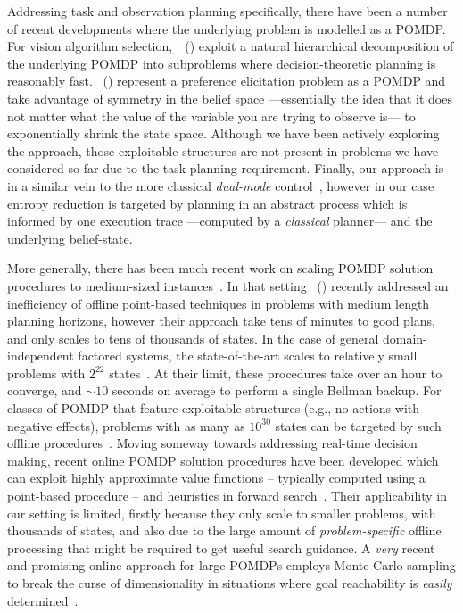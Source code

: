 






Addressing task and observation planning specifically, there have been
a number of recent developments where the underlying problem is
modelled as a POMDP.
For vision algorithm
selection,~\citeauthor{hippo-jnl}~(\citeyear{hippo-jnl}) exploit a
natural hierarchical decomposition of the underlying POMDP into
subproblems where decision-theoretic planning is reasonably
fast. \citeauthor{doshi08:pref_elic}~(\citeyear{doshi08:pref_elic})
represent a preference elicitation problem as a POMDP and take
advantage of symmetry in the belief space ---essentially the idea that
it does not matter what the value of the variable you are trying to
observe is--- to exponentially shrink the state space. Although we
have been actively exploring the \citeauthor{doshi08:pref_elic}
approach, those exploitable structures are not present in problems we
have considered so far due to the task planning requirement. 
Finally,
our approach is in a similar vein to the more classical {\em
dual-mode} control~\cite{cassandra96actingunder}, however in our case
entropy reduction is targeted by planning in an abstract process which
is informed by one execution trace ---computed by a {\em classical}
planner--- and the underlying belief-state.


More generally, there has been much recent work on scaling POMDP
solution procedures to medium-sized
instances~\cite{shani:etal:08,KurHsu08}. In that
setting \citeauthor{kurniawati:etal:2010}~(\citeyear{kurniawati:etal:2010})
recently addressed an inefficiency of offline point-based techniques
in problems with medium length planning horizons, however their
approach take tens of minutes to good plans, and only scales to tens
of thousands of states. In the case of general domain-independent
factored systems, the state-of-the-art scales to relatively small
problems with $2^{22}$ states~\cite{shani:etal:2008}. At their limit,
these procedures take over an hour to converge, and $\sim10$ seconds
on average to perform a single Bellman backup.  For classes of POMDP
that feature exploitable structures (e.g., no actions with negative
effects), problems with as many as $10^{30}$ states can be targeted by
such offline procedures~\cite{brunskill:russell:2010}. Moving someway
towards addressing real-time decision making, recent online POMDP
solution procedures have been developed which can exploit highly
approximate value functions -- typically computed using a point-based
procedure -- and heuristics in forward
search~\cite{ross:etal:2008}. Their applicability in our setting is
limited, firstly because they only scale to smaller problems, with
thousands of states, and also due to the large amount of
\emph{problem-specific} offline processing that might be required to get useful
search guidance. A {\em very} recent and promising online approach for
large POMDPs employs Monte-Carlo sampling to break the curse of
dimensionality in situations where goal reachability is {\em easily}
determined~\cite{silver:veness:2010}.


